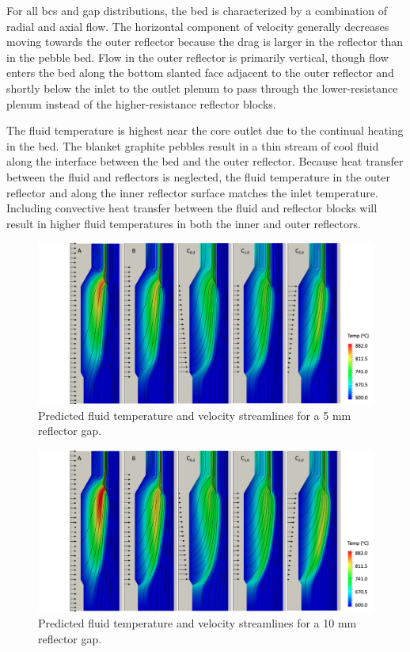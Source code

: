 For all \glspl{bc} and gap distributions, the bed is characterized by a combination of radial and axial flow. The horizontal component of velocity generally decreases moving towards the outer reflector because the drag is larger in the reflector than in the pebble bed. Flow in the outer reflector is primarily vertical, though flow enters the bed along the bottom slanted face adjacent to the outer reflector and shortly below the inlet to the outlet plenum to pass through the lower-resistance plenum instead of the higher-resistance reflector blocks.

The fluid temperature is highest near the core outlet due to the continual heating in the bed. The blanket graphite pebbles result in a thin stream of cool fluid along the interface between the bed and the outer reflector. Because heat transfer between the fluid and reflectors is neglected, the fluid temperature in the outer reflector and along the inner reflector surface matches the inlet temperature. Including convective heat transfer between the fluid and reflector blocks will result in higher fluid temperatures in both the inner and outer reflectors.

\begin{figure}[!htb]
\centering
\includegraphics[width=0.85\linewidth]{figs/fluid_temp_05.png}
\caption{Predicted fluid temperature and velocity streamlines for a 5 \si{\milli\meter} reflector gap.}
\label{fig:bcs_temp}
\end{figure}

\begin{figure}[!htb]
\centering
\includegraphics[width=0.85\linewidth]{figs/fluid_temp_1.png}
\caption{Predicted fluid temperature and velocity streamlines for a 10 \si{\milli\meter} reflector gap.}
\label{fig:bcs_temp2}
\end{figure}

